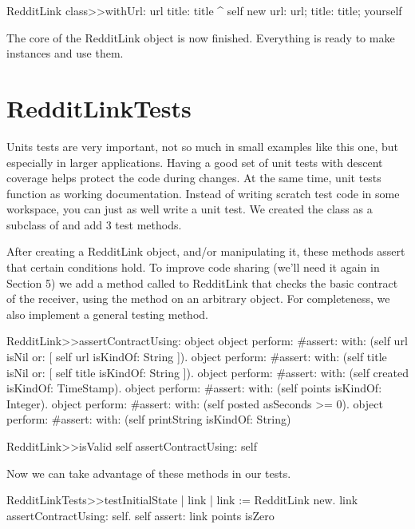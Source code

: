 \documentclass[a4paper,10pt,twoside]{book}
\begin{document}
\begin{code}{}
RedditLink class>>withUrl: url title: title
   ^ self new url: url; title: title; yourself
\end{code}

The core of the RedditLink object is now finished. Everything is ready to make instances and use them.


\section{RedditLinkTests}

Units tests are very important, not so much in small examples like this one, but especially in larger applications. Having a good set of unit tests with descent coverage helps protect the code during changes. At the same time, unit tests function as working documentation. Instead of writing scratch test code in some workspace, you can just as well write a unit test. We created the class  as a subclass of  and add 3 test methods.



After creating a RedditLink object, and/or manipulating it, these methods assert that certain conditions hold. To improve code sharing (we'll need it again in Section 5) we add a method called  to RedditLink that checks the basic contract of the receiver, using the method  on an arbitrary object. For completeness, we also implement a general  testing method.


\begin{code}{}
RedditLink>>assertContractUsing: object
   object perform: #assert: with: (self url isNil or: [ self url isKindOf: String ]).
   object perform: #assert: with: (self title isNil or: [ self title isKindOf: String ]).
   object perform: #assert: with: (self created isKindOf: TimeStamp).
   object perform: #assert: with: (self points isKindOf: Integer).
   object perform: #assert: with: (self posted asSeconds >= 0).
   object perform: #assert: with: (self printString isKindOf: String)
   
RedditLink>>isValid
    self assertContractUsing: self
\end{code}

Now we can take advantage of these methods in our tests.

\begin{code}{}
RedditLinkTests>>testInitialState
    | link | 
    link := RedditLink new. 
    link assertContractUsing: self. 
    self assert: link points isZero
\end{code}
\end{document}
